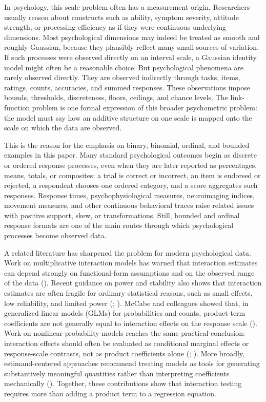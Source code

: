 \documentclass[
  man,
  longtable,
  nolmodern,
  notxfonts,
  notimes,
  colorlinks=true,linkcolor=blue,citecolor=blue,urlcolor=blue]{apa7}
\begin{document}
In psychology, this scale problem often has a measurement origin.
Researchers usually reason about constructs such as ability, symptom
severity, attitude strength, or processing efficiency as if they were
continuous underlying dimensions. Most psychological dimensions may
indeed be treated as smooth and roughly Gaussian, because they plausibly
reflect many small sources of variation. If such processes were observed
directly on an interval scale, a Gaussian identity model might often be
a reasonable choice. But psychological phenomena are rarely observed
directly. They are observed indirectly through tasks, items, ratings,
counts, accuracies, and summed responses. These observations impose
bounds, thresholds, discreteness, floors, ceilings, and chance levels.
The link-function problem is one formal expression of this broader
psychometric problem: the model must say how an additive structure on
one scale is mapped onto the scale on which the data are observed.

This is the reason for the emphasis on binary, binomial, ordinal, and
bounded examples in this paper. Many standard psychological outcomes
begin as discrete or ordered response processes, even when they are
later reported as percentages, means, totals, or composites: a trial is
correct or incorrect, an item is endorsed or rejected, a respondent
chooses one ordered category, and a score aggregates such responses.
Response times, psychophysiological measures, neuroimaging indices,
movement measures, and other continuous behavioral traces raise related
issues with positive support, skew, or transformations. Still, bounded
and ordinal response formats are one of the main routes through which
psychological processes become observed data.

A related literature has sharpened the problem for modern psychological
data. Work on multiplicative interaction models has warned that
interaction estimates can depend strongly on functional-form assumptions
and on the observed range of the data
(). Recent
guidance on power and stability also shows that interaction estimates
are often fragile for ordinary statistical reasons, such as small
effects, low reliability, and limited power
(;
). McCabe and
colleagues showed that, in generalized linear models (GLMs) for
probabilities and counts, product-term coefficients are not generally
equal to interaction effects on the response scale
(). Work on nonlinear
probability models reaches the same practical conclusion: interaction
effects should often be evaluated as conditional marginal effects or
response-scale contrasts, not as product coefficients alone
(;
). More broadly, estimand-centered
approaches recommend treating models as tools for generating
substantively meaningful quantities rather than interpreting
coefficients mechanically (). Together, these contributions show that
interaction testing requires more than adding a product term to a
regression equation.
\end{document}
